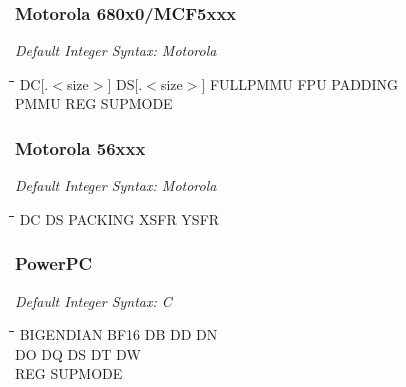 \subsubsection{Motorola 680x0/MCF5xxx}

{\em Default Integer Syntax: Motorola}

{\tt\begin{tabbing}
\hspace{3cm}\=\hspace{3cm}\=\hspace{3cm}\=\hspace{3cm}\=\kill
DC[.$<$size$>$]\> DS[.$<$size$>$] \> FULLPMMU    \> FPU         \> PADDING \\
PMMU       \> REG         \> SUPMODE \\
\end{tabbing}}

\subsubsection{Motorola 56xxx}

{\em Default Integer Syntax: Motorola}

{\tt\begin{tabbing}
\hspace{3cm}\=\hspace{3cm}\=\hspace{3cm}\=\hspace{3cm}\=\kill
DC         \> DS          \> PACKING     \> XSFR        \> YSFR \\
\end{tabbing}}

\subsubsection{PowerPC}

{\em Default Integer Syntax: C}

{\tt\begin{tabbing}
\hspace{3cm}\=\hspace{3cm}\=\hspace{3cm}\=\hspace{3cm}\=\kill
BIGENDIAN  \> BF16        \> DB          \> DD          \> DN \\
DO         \> DQ          \> DS          \> DT          \> DW \\
REG        \> SUPMODE \\
\end{tabbing}}

